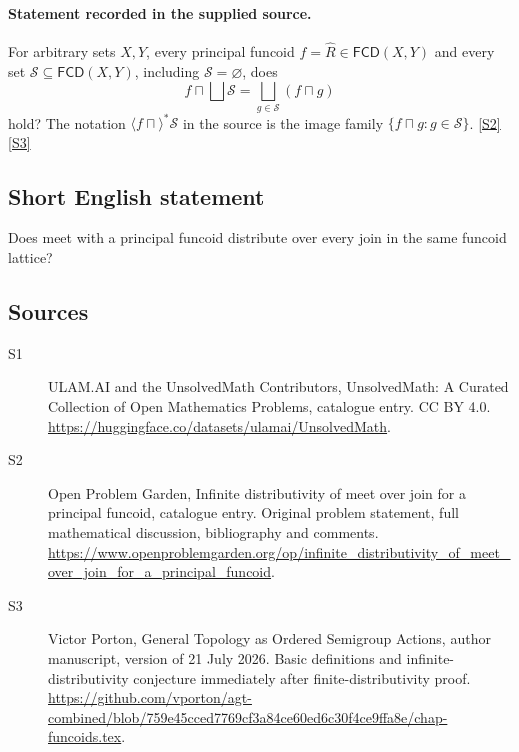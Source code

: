 \documentclass[11pt]{article}
\newcommand{\sref}[2]{\hyperlink{source:#1:#2}{[S#2]}}
\begin{document}
\paragraph{Statement recorded in the supplied source.}
For arbitrary sets $X,Y$, every principal funcoid $f=\widehat R\in\mathsf{FCD}(X,Y)$ and every set $\mathcal S\subseteq\mathsf{FCD}(X,Y)$, including $\mathcal S=\varnothing$, does
\[
 f\sqcap\bigsqcup\mathcal S
 =\bigsqcup_{g\in\mathcal S}(f\sqcap g)
\]
hold? The notation $\langle f\sqcap\rangle^*\mathcal S$ in the source is the image family $\{f\sqcap g:g\in\mathcal S\}$. \sref{statement}{2}\sref{statement}{3}
\subsection{Short English statement}
Does meet with a principal funcoid distribute over every join in the same funcoid lattice?
\subsection{Sources}
\begin{description}
\item[\hypertarget{source:statement:1}{S1}] ULAM.AI and the UnsolvedMath Contributors, UnsolvedMath: A Curated Collection of Open Mathematics Problems, catalogue entry. CC BY 4.0. \url{https://huggingface.co/datasets/ulamai/UnsolvedMath}.
\item[\hypertarget{source:statement:2}{S2}] Open Problem Garden, Infinite distributivity of meet over join for a principal funcoid, catalogue entry. Original problem statement, full mathematical discussion, bibliography and comments. \url{https://www.openproblemgarden.org/op/infinite_distributivity_of_meet_over_join_for_a_principal_funcoid}.
\item[\hypertarget{source:statement:3}{S3}] Victor Porton, General Topology as Ordered Semigroup Actions, author manuscript, version of 21 July 2026. Basic definitions and infinite-distributivity conjecture immediately after finite-distributivity proof. \url{https://github.com/vporton/agt-combined/blob/759e45cced7769cf3a84ce60ed6c30f4ce9ffa8e/chap-funcoids.tex}.
\end{description}
\label{end:statement}
\end{document}
